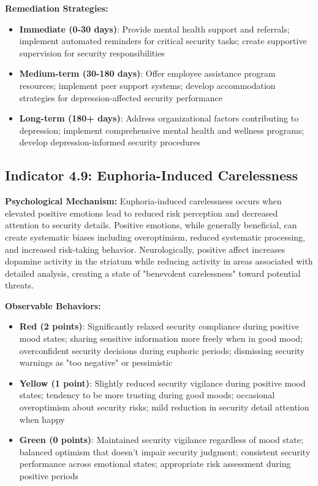 \documentclass[11pt,a4paper]{article}
\begin{document}
\textbf{Remediation Strategies:}
\begin{itemize}
\item \textbf{Immediate (0-30 days)}: Provide mental health support and referrals; implement automated reminders for critical security tasks; create supportive supervision for security responsibilities
\item \textbf{Medium-term (30-180 days)}: Offer employee assistance program resources; implement peer support systems; develop accommodation strategies for depression-affected security performance
\item \textbf{Long-term (180+ days)}: Address organizational factors contributing to depression; implement comprehensive mental health and wellness programs; develop depression-informed security procedures
\end{itemize}

\subsection{Indicator 4.9: Euphoria-Induced Carelessness}

\textbf{Psychological Mechanism:}
Euphoria-induced carelessness occurs when elevated positive emotions lead to reduced risk perception and decreased attention to security details. Positive emotions, while generally beneficial, can create systematic biases including overoptimism, reduced systematic processing, and increased risk-taking behavior\cite{isen1999}. Neurologically, positive affect increases dopamine activity in the striatum while reducing activity in areas associated with detailed analysis, creating a state of "benevolent carelessness" toward potential threats.

\textbf{Observable Behaviors:}
\begin{itemize}
\item \textbf{Red (2 points)}: Significantly relaxed security compliance during positive mood states; sharing sensitive information more freely when in good mood; overconfident security decisions during euphoric periods; dismissing security warnings as "too negative" or pessimistic
\item \textbf{Yellow (1 point)}: Slightly reduced security vigilance during positive mood states; tendency to be more trusting during good moods; occasional overoptimism about security risks; mild reduction in security detail attention when happy
\item \textbf{Green (0 points)}: Maintained security vigilance regardless of mood state; balanced optimism that doesn't impair security judgment; consistent security performance across emotional states; appropriate risk assessment during positive periods
\end{itemize}
\end{document}
